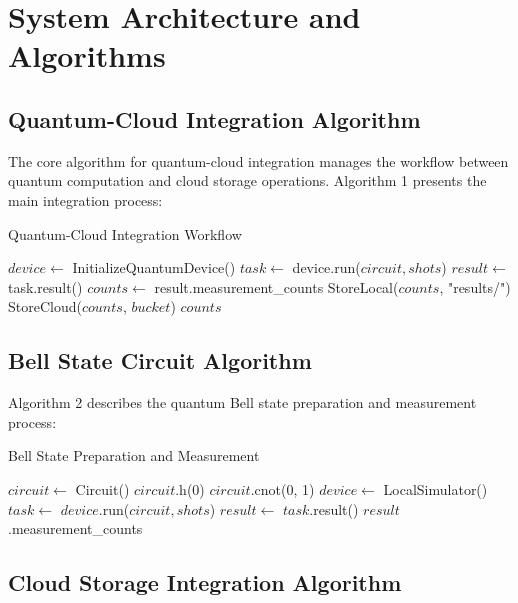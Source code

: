 \documentclass[onecolumn]{IEEEtran}
\begin{document}
\section{System Architecture and Algorithms}

\subsection{Quantum-Cloud Integration Algorithm}

The core algorithm for quantum-cloud integration manages the workflow between quantum computation and cloud storage operations. Algorithm 1 presents the main integration process:


\begin{algorithm}[h]
\caption{Quantum-Cloud Integration Workflow}
\begin{algorithmic}[1]
\State $device \leftarrow$ InitializeQuantumDevice()
\State $task \leftarrow$ device.run($circuit, shots$)
\State $result \leftarrow$ task.result()
\State $counts \leftarrow$ result.measurement\_counts
\State StoreLocal($counts$, "results/")
\State StoreCloud($counts$, $bucket$)
\State \Return $counts$
\EndFunction
\end{algorithmic}
\end{algorithm}

\subsection{Bell State Circuit Algorithm}

Algorithm 2 describes the quantum Bell state preparation and measurement process:

\begin{algorithm}[h]
\caption{Bell State Preparation and Measurement}
\begin{algorithmic}[1]
\State $circuit \leftarrow$ Circuit()
\State $circuit$.h(0) 
\State $circuit$.cnot(0, 1) 
\State $device \leftarrow$ LocalSimulator()
\State $task \leftarrow$ $device$.run($circuit, shots$)
\State $result \leftarrow$ $task$.result()
\State \Return $result$.measurement\_counts
\EndFunction
\end{algorithmic}
\end{algorithm}

\subsection{Cloud Storage Integration Algorithm}
\end{document}
